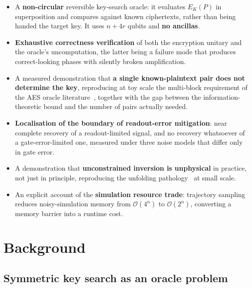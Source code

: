 \documentclass[11pt,a4paper]{article}
\newcommand{\Ek}{E_K}
\newcommand{\bigO}[1]{\mathcal{O}\!\left(#1\right)}
\begin{document}
\begin{itemize}
  \item A \textbf{non-circular} reversible key-search oracle: it evaluates
        $\Ek(P)$ in superposition and compares against known ciphertexts,
        rather than being handed the target key. It uses
        $n + 4r$ qubits and \textbf{no ancillas}.
  \item \textbf{Exhaustive correctness verification} of both the encryption
        unitary and the oracle's uncomputation, the latter being a failure mode
        that produces correct-looking phases with silently broken amplification.
  \item A measured demonstration that \textbf{a single known-plaintext pair
        does not determine the key}, reproducing at toy scale the multi-block
        requirement of the AES oracle literature~\citep{grassl2016,jaques2020},
        together with the gap between the information-theoretic bound and the
        number of pairs actually needed.
  \item \textbf{Localisation of the boundary of readout-error mitigation}: near
        complete recovery of a readout-limited signal, and no recovery
        whatsoever of a gate-error-limited one, measured under three noise
        models that differ only in gate error.
  \item A demonstration that \textbf{unconstrained inversion is unphysical} in
        practice, not just in principle, reproducing the unfolding
        pathology~\citep{nachman2020} at small scale.
  \item An explicit account of the \textbf{simulation resource trade}:
        trajectory sampling reduces noisy-simulation memory from $\bigO{4^n}$ to
        $\bigO{2^n}$, converting a memory barrier into a runtime cost.
\end{itemize}

\section{Background}

\subsection{Symmetric key search as an oracle problem}
\end{document}

